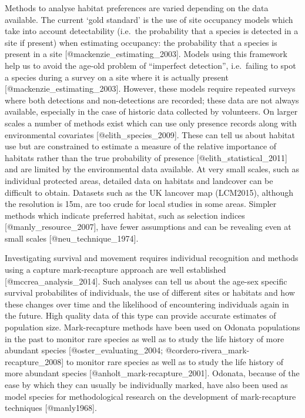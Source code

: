 \documentclass[]{article}
\begin{document}
Methods to analyse habitat preferences are varied depending on the data
available. The current `gold standard' is the use of site occupancy
models which take into account detectability (i.e.~the probability that
a species is detected in a site if present) when estimating occupancy:
the probability that a species is present in a site
{[}@mackenzie\_estimating\_2003{]}. Models using this framework help us
to avoid the age-old problem of ``imperfect detection'', i.e.~failing to
spot a species during a survey on a site where it is actually present
{[}@mackenzie\_estimating\_2003{]}. However, these models require
repeated surveys where both detections and non-detections are recorded;
these data are not always available, especially in the case of historic
data collected by volunteers. On larger scales a number of methods exist
which can use only presence records along with environmental covariates
{[}@elith\_species\_2009{]}. These can tell us about habitat use but are
constrained to estimate a measure of the relative importance of habitats
rather than the true probability of presence
{[}@elith\_statistical\_2011{]} and are limited by the environmental
data available. At very small scales, such as individual protected
areas, detailed data on habitats and landcover can be difficult to
obtain. Datasets such as the UK lancover map (LCM2015), although the
resolution is 15m, are too crude for local studies in some areas.
Simpler methods which indicate preferred habitat, such as selection
indices {[}@manly\_resource\_2007{]}, have fewer assumptions and can be
revealing even at small scales {[}@neu\_technique\_1974{]}.

Investigating survival and movement requires individual recognition and
methods using a capture mark-recapture approach are well established
{[}@mccrea\_analysis\_2014{]}. Such analyses can tell us about the
age-sex specific survival probabilites of individuals, the use of
different sites or habitats and how these changes over time and the
likelihood of encountering individuals again in the future. High quality
data of this type can provide accurate estimates of population size.
Mark-recapture methods have been used on Odonata populations in the past
to monitor rare species as well as to study the life history of more
abundant species {[}@oster\_evaluating\_2004;
@cordero-rivera\_mark-recapture\_2008{]} to monitor rare species as well
as to study the life history of more abundant species
{[}@anholt\_mark-recapture\_2001{]}. Odonata, because of the ease by
which they can usually be individually marked, have also been used as
model species for methodological research on the development of
mark-recapture techniques {[}@manly1968{]}.
\end{document}
